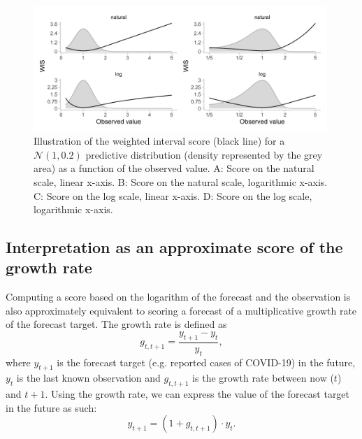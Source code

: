 \documentclass{article}
\begin{document}
\begin{figure}[h!]
    \centering
    \includegraphics[width=0.99\textwidth]{output/figures/SIM-effect-log-score.png}
    \caption{Illustration of the weighted interval score (black line) for a $\mathcal{N}(1, 0.2)$ predictive distribution (density represented by the grey area) as a function of the observed value. A: Score on the natural scale, linear x-axis. B: Score on the natural scale, logarithmic x-axis. C: Score on the log scale, linear x-axis. D: Score on the log scale, logarithmic x-axis.} 
    \label{fig:change-in-scores}
\end{figure}





\subsection{Interpretation as an approximate score of the growth rate}

Computing a score based on the logarithm of the forecast and the observation is also approximately equivalent to scoring a forecast of a multiplicative growth rate of the forecast target. The growth rate is defined as
%
\begin{equation}
    g_{t, t+1} = \frac{y_{t+1} - y_t}{y_t},
\end{equation}
%
where $y_{t+1}$ is the forecast target (e.g. reported cases of COVID-19) in the future, $y_t$ is the last known observation and $g_{t, t+1}$ is the growth rate between now ($t$) and $t+1$. 
Using the growth rate, we can express the value of the forecast target in the future as such: 
%
\begin{equation}
y_{t+1} = (1 + g_{t, t+1}) \cdot y_t.
\end{equation}
%
\end{document}
